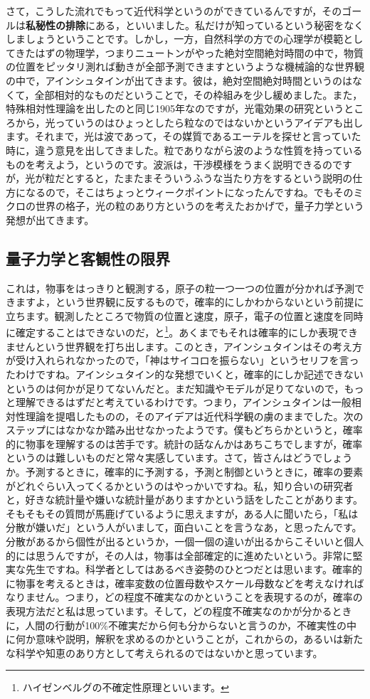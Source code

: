 \documentclass{ltjsbook}
\begin{document}
さて，こうした流れでもって近代科学というのができているんですが，そのゴールは\textbf{私秘性の排除}にある，といいました。私だけが知っているという秘密をなくしましょうということです。しかし，一方，自然科学の方での心理学が模範としてきたはずの物理学，つまりニュートンがやった絶対空間絶対時間の中で，物質の位置をピッタリ測れば動きが全部予測できますというような機械論的な世界観の中で，アインシュタインが出てきます。彼は，絶対空間絶対時間というのはなくて，全部相対的なものだということで，その枠組みを少し緩めました。また，特殊相対性理論を出したのと同じ1905年なのですが，光電効果の研究というところから，光っていうのはひょっとしたら粒なのではないかというアイデアも出します。それまで，光は波であって，その媒質であるエーテルを探せと言っていた時に，違う意見を出してきました。粒でありながら波のような性質を持っているものを考えよう，というのです。波派は，干渉模様をうまく説明できるのですが，光が粒だとすると，たまたまそういうふうな当たり方をするという説明の仕方になるので，そこはちょっとウィークポイントになったんですね。でもそのミクロの世界の格子，光の粒のあり方というのを考えたおかげで，量子力学という発想が出てきます。
\subsection{量子力学と客観性の限界}
これは，物事をはっきりと観測する，原子の粒一つ一つの位置が分かれば予測できますよ，という世界観に反するもので，確率的にしかわからないという前提に立ちます。観測したところで物質の位置と速度，原子，電子の位置と速度を同時に確定することはできないのだ，と\footnote{ハイゼンベルグの不確定性原理といいます。}。あくまでもそれは確率的にしか表現できませんという世界観を打ち出します。このとき，アインシュタインはその考え方が受け入れられなかったので，「神はサイコロを振らない」というセリフを言ったわけですね。アインシュタイン的な発想でいくと，確率的にしか記述できないというのは何かが足りてないんだと。まだ知識やモデルが足りてないので，もっと理解できるはずだと考えているわけです。つまり，アインシュタインは一般相対性理論を提唱したものの，そのアイデアは近代科学観の虜のままでした。次のステップにはなかなか踏み出せなかったようです。僕もどちらかというと，確率的に物事を理解するのは苦手です。統計の話なんかはあちこちでしますが，確率というのは難しいものだと常々実感しています。さて，皆さんはどうでしょうか。予測するときに，確率的に予測する，予測と制御というときに，確率の要素がどれぐらい入ってくるかというのはやっかいですね。私，知り合いの研究者と，好きな統計量や嫌いな統計量がありますかという話をしたことがあります。そもそもその質問が馬鹿げているように思えますが，ある人に聞いたら，「私は分散が嫌いだ」という人がいまして，面白いことを言うなあ，と思ったんです。分散があるから個性が出るというか，一個一個の違いが出るからこそいいと個人的には思うんですが，その人は，物事は全部確定的に進めたいという。非常に堅実な先生ですね。科学者としてはあるべき姿勢のひとつだとは思います。確率的に物事を考えるときは，確率変数の位置母数やスケール母数などを考えなければなりません。つまり，どの程度不確実なのかということを表現するのが，確率の表現方法だと私は思っています。そして，どの程度不確実なのかが分かるときに，人間の行動が100\%不確実だから何も分からないと言うのか，不確実性の中に何か意味や説明，解釈を求めるのかということが，これからの，あるいは新たな科学や知恵のあり方として考えられるのではないかと思っています。
\end{document}
